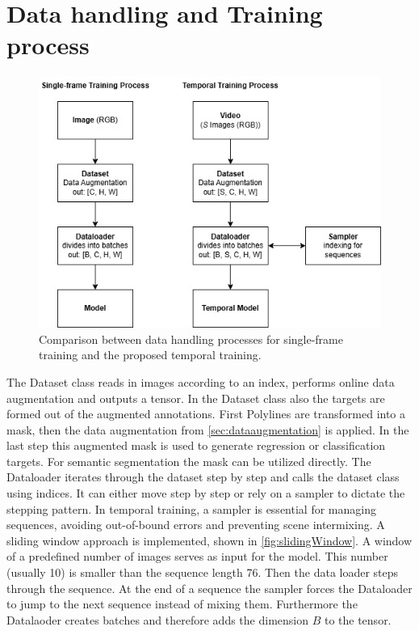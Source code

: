 \section{Data handling and Training process}
\label{sec:datahandling}

\begin{figure}[H]
    \centering
    \includegraphics[width=0.6\linewidth]{PICs/temporalModels/Datahandling.png}
    \caption{Comparison between data handling processes for single-frame training and the proposed temporal training.}
    \label{fig:dataHandlingProcess}
\end{figure}

The Dataset class reads in images according to an index, performs online data augmentation and outputs a tensor.
In the Dataset class also the targets are formed out of the augmented annotations.
First Polylines are transformed into a mask, then the data augmentation from \autoref{sec:dataaugmentation} is applied.
In the last step this augmented mask is used to generate regression or classification targets.
For semantic segmentation the mask can be utilized directly.
The Dataloader iterates through the dataset step by step and calls the dataset class using indices.
It can either move step by step or rely on a sampler to dictate the stepping pattern.
In temporal training, a sampler is essential for managing sequences, avoiding out-of-bound errors and preventing scene intermixing.
A sliding window approach is implemented, shown in \autoref{fig:slidingWindow}.
A window of a predefined number of images serves as input for the model.
This number (usually 10) is smaller than the sequence length 76.
Then the data loader steps through the sequence.
At the end of a sequence the sampler forces the Dataloader to jump to the next sequence instead of mixing them.
Furthermore the Datalaoder creates batches and therefore adds the dimension $B$ to the tensor.

